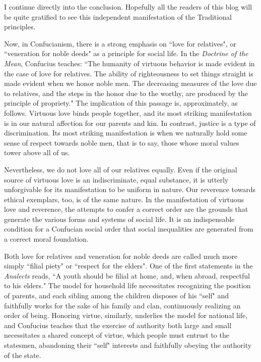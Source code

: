 \begin{quotex}
I continue directly into the conclusion. Hopefully all the readers of this blog will be quite gratified to see this independent manifestation of the Traditional principles.

\end{quotex}


Now, in Confucianism, there is a strong emphasis on ``love for relatives", or ``veneration for noble deeds" as a principle for social life. In the \emph{Doctrine of the Mean}, Confucius teaches: ``The humanity of virtuous behavior is made evident in the case of love for relatives. The ability of righteousness to set things straight is made evident when we honor noble men. The decreasing measures of the love due to relatives, and the steps in the honor due to the worthy, are produced by the principle of propriety." The implication of this passage is, approximately, as follows. Virtuous love binds people together, and its most striking manifestation is in our natural affection for our parents and kin. In contrast, justice is a type of discrimination. Its most striking manifestation is when we naturally hold some sense of respect towards noble men, that is to say, those whose moral values tower above all of us.

Nevertheless, we do not love all of our relatives equally. Even if the original source of virtuous love is an indiscriminate, equal substance, it is utterly unforgivable for its manifestation to be uniform in nature. Our reverence towards ethical exemplars, too, is of the same nature. In the manifestation of virtuous love and reverence, the attempts to confer a correct order are the grounds that generate the various forms and systems of social life. It is an indispensable condition for a Confucian social order that social inequalities are generated from a correct moral foundation.

Both love for relatives and veneration for noble deeds are called much more simply ``filial piety" or ``respect for the elders". One of the first statements in the \emph{Analects} reads, ``A youth should be filial at home, and, when abroad, respectful to his elders." The model for household life necessitates recognizing the position of parents, and each sibling among the children disposes of his ``self" and faithfully works for the sake of his family and clan, continuously realizing an order of being. Honoring virtue, similarly, underlies the model for national life, and Confucius teaches that the exercise of authority both large and small necessitates a shared concept of virtue, which people must entrust to the statesmen, abandoning their ``self" interests and faithfully obeying the authority of the state.

